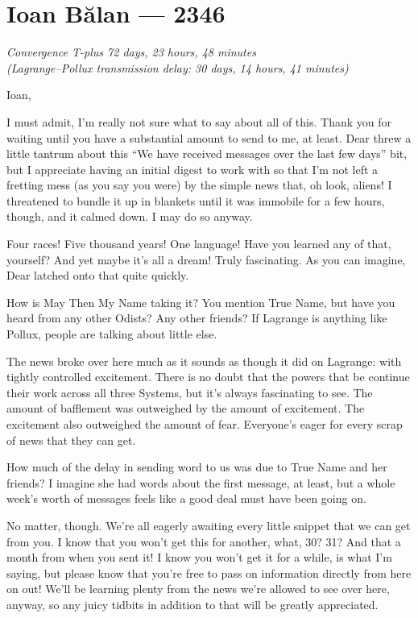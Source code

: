 \hypertarget{ioan-bux103lan-2346}{%
\chapter{Ioan Bălan — 2346}}

\begin{center}
\emph{Convergence T-plus 72 days, 23 hours, 48 minutes}\\
\emph{(Lagrange--Pollux transmission delay: 30 days, 14 hours, 41 minutes)}
\end{center}

\noindent Ioan,

I must admit, I'm really not sure what to say about all of this. Thank you for waiting until you have a substantial amount to send to me, at least. Dear threw a little tantrum about this ``We have received messages over the last few days'' bit, but I appreciate having an initial digest to work with so that I'm not left a fretting mess (as you say you were) by the simple news that, oh look, aliens! I threatened to bundle it up in blankets until it was immobile for a few hours, though, and it calmed down. I may do so anyway.

Four races! Five thousand years! One language! Have you learned any of that, yourself? And yet maybe it's all a dream! Truly fascinating. As you can imagine, Dear latched onto that quite quickly.
 
How is May Then My Name taking it? You mention True Name, but have you heard from any other Odists? Any other friends? If Lagrange is anything like Pollux, people are talking about little else.

The news broke over here much as it sounds as though it did on Lagrange: with tightly controlled excitement. There is no doubt that the powers that be continue their work across all three Systems, but it's always fascinating to see. The amount of bafflement was outweighed by the amount of excitement. The excitement also outweighed the amount of fear. Everyone's eager for every scrap of news that they can get.

How much of the delay in sending word to us was due to True Name and her friends? I imagine she had words about the first message, at least, but a whole week's worth of messages feels like a good deal must have been going on.

No matter, though. We're all eagerly awaiting every little snippet that we can get from you. I know that you won't get this for another, what, 30? 31? And that a month from when you sent it! I know you won't get it for a while, is what I'm saying, but please know that you're free to pass on information directly from here on out! We'll be learning plenty from the news we're allowed to see over here, anyway, so any juicy tidbits in addition to that will be greatly appreciated.

